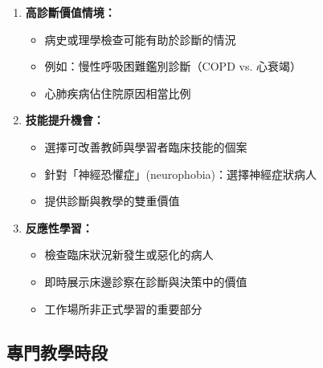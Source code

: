 \documentclass[11pt,a4paper]{article}
\begin{document}
\begin{enumerate}
    \item \textbf{高診斷價值情境：}
    \begin{itemize}
        \item 病史或理學檢查可能有助於診斷的情況
        \item 例如：慢性呼吸困難鑑別診斷（COPD vs. 心衰竭）
        \item 心肺疾病佔住院原因相當比例
    \end{itemize}
    
    \item \textbf{技能提升機會：}
    \begin{itemize}
        \item 選擇可改善教師與學習者臨床技能的個案
        \item 針對「神經恐懼症」(neurophobia)：選擇神經症狀病人
        \item 提供診斷與教學的雙重價值
    \end{itemize}
    
    \item \textbf{反應性學習：}
    \begin{itemize}
        \item 檢查臨床狀況新發生或惡化的病人
        \item 即時展示床邊診察在診斷與決策中的價值
        \item 工作場所非正式學習的重要部分
    \end{itemize}
\end{enumerate}

\subsection{專門教學時段}
\end{document}
